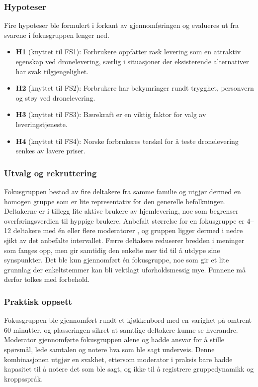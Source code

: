 \subsubsection*{Hypoteser}

Fire hypoteser ble formulert i forkant av gjennomføringen og evalueres ut fra
svarene i fokusgruppen lenger ned.

\begin{itemize}[leftmargin=1.5em, nosep]
  \item \textbf{H1} (knyttet til FS1): Forbrukere oppfatter rask
  levering som en attraktiv egenskap ved dronelevering, særlig i situasjoner
  der eksisterende alternativer har svak tilgjengelighet.
  \item \textbf{H2} (knyttet til FS2): Forbrukere har bekymringer rundt trygghet,
  personvern og støy ved dronelevering.
  \item \textbf{H3} (knyttet til FS3): Bærekraft er en viktig faktor for valg
  av leveringstjeneste.
  \item \textbf{H4} (knyttet til FS4): Norske forbrukeres terskel for å teste
  dronelevering senkes av lavere priser.
\end{itemize}

\subsubsection*{Utvalg og rekruttering}

Fokusgruppen bestod av fire deltakere fra samme familie og utgjør dermed en
homogen gruppe som er lite representativ for den generelle befolkningen. Deltakerne er i tillegg lite aktive brukere av
hjemlevering, noe som begrenser overføringsverdien til hyppige brukere.
Anbefalt størrelse for en fokusgruppe er 4--12 deltakere med én eller flere
moderatorer \parencite[Forelesning 7]{aspelund2026_forelesninger}, og gruppen ligger dermed
i nedre sjikt av det anbefalte intervallet. Færre deltakere reduserer
bredden i meninger som fanges opp, men gir samtidig den enkelte mer tid til
å utdype sine synspunkter. Det ble kun gjennomført én fokusgruppe, noe som gir
et lite grunnlag der enkeltstemmer kan bli vektlagt uforholdsmessig mye. Funnene
må derfor tolkes med forbehold.

\subsubsection*{Praktisk oppsett}

Fokusgruppen ble gjennomført rundt et kjøkkenbord med en varighet på omtrent
60 minutter, og plasseringen sikret at samtlige deltakere kunne se hverandre.
Moderator gjennomførte fokusgruppen alene og hadde ansvar for å stille
spørsmål, lede samtalen og notere hva som ble sagt underveis. Denne kombinasjonen
utgjør en svakhet, ettersom moderator i praksis bare hadde kapasitet til å
notere det som ble sagt, og ikke til å registrere gruppedynamikk og kroppsspråk.

